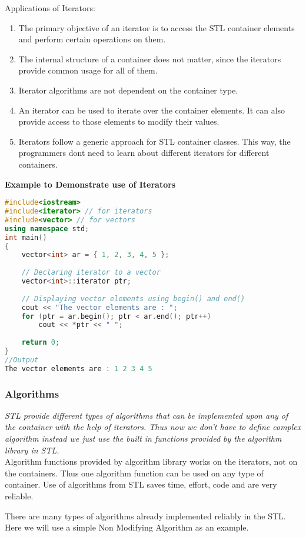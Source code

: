 \documentclass[11pt]{article}
\begin{document}
\noindent
Applications of Iterators:
\begin{enumerate}
	\item The primary objective of an iterator is to access the STL container elements and perform certain operations on them.
	\item The internal structure of a container does not matter, since the iterators provide common usage for all of them.
	\item Iterator algorithms are not dependent on the container type.
	\item An iterator can be used to iterate over the container elements. It can also provide access to those elements to modify their values.
	\item Iterators follow a generic approach for STL container classes. This way, the programmers dont need to learn about different iterators for different containers.
\end{enumerate}
\textbf{Example to Demonstrate use of Iterators}
\begin{lstlisting}[language=C++]
#include<iostream>
#include<iterator> // for iterators
#include<vector> // for vectors
using namespace std;
int main()
{
	vector<int> ar = { 1, 2, 3, 4, 5 };
		
	// Declaring iterator to a vector
	vector<int>::iterator ptr;
		
	// Displaying vector elements using begin() and end()
	cout << "The vector elements are : ";
	for (ptr = ar.begin(); ptr < ar.end(); ptr++)
		cout << *ptr << " ";
		
	return 0;    
}
//Output
The vector elements are : 1 2 3 4 5 
\end{lstlisting}
\subsubsection{Algorithms}
\textit{STL provide different types of algorithms that can be implemented upon any of the container with the help of iterators. Thus now we don't have to define complex algorithm instead we just use the built in functions provided by the algorithm library in STL.
}\\

Algorithm functions provided by algorithm library works on the iterators, not on the containers. Thus one algorithm function can be used on any type of container. Use of algorithms from STL saves time, effort, code and are very reliable.

There are many types of algorithms already implemented reliably in the STL. Here we will use a simple Non Modifying Algorithm as an example.
\end{document}
